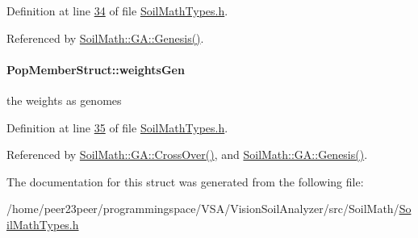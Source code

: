 Definition at line \hyperlink{_soil_math_types_8h_source_l00034}{34} of file \hyperlink{_soil_math_types_8h_source}{Soil\+Math\+Types.\+h}.



Referenced by \hyperlink{_g_a_8cpp_source_l00050}{Soil\+Math\+::\+G\+A\+::\+Genesis()}.

\hypertarget{struct_pop_member_struct_a072fadb4863e0cf77b55ad3b46b62522}{}
\paragraph[{weights\+Gen}]{ Pop\+Member\+Struct\+::weights\+Gen}\label{struct_pop_member_struct_a072fadb4863e0cf77b55ad3b46b62522}
the weights as genomes 

Definition at line \hyperlink{_soil_math_types_8h_source_l00035}{35} of file \hyperlink{_soil_math_types_8h_source}{Soil\+Math\+Types.\+h}.



Referenced by \hyperlink{_g_a_8cpp_source_l00072}{Soil\+Math\+::\+G\+A\+::\+Cross\+Over()}, and \hyperlink{_g_a_8cpp_source_l00050}{Soil\+Math\+::\+G\+A\+::\+Genesis()}.



The documentation for this struct was generated from the following file\+:\begin{DoxyCompactItemize}
\item 
/home/peer23peer/programmingspace/\+V\+S\+A/\+Vision\+Soil\+Analyzer/src/\+Soil\+Math/\hyperlink{_soil_math_types_8h}{Soil\+Math\+Types.\+h}\end{DoxyCompactItemize}
